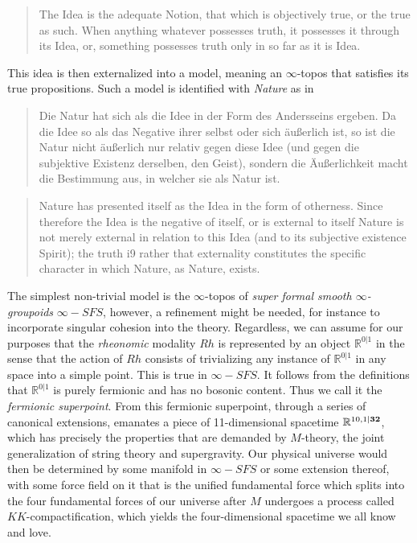 \documentclass{article}
\begin{document}
\begin{quote}
    The Idea is the adequate Notion, that which is objectively true, or the true as such. When anything whatever possesses truth, it possesses it through its Idea, or, something possesses truth only in so far as it is Idea.
\end{quote}

This idea is then externalized into a model, meaning an $\infty$-topos that satisfies its true propositions. Such a model is identified with \emph{Nature} as in 

\begin{quote}
    Die Natur hat sich als die Idee in der Form des Andersseins ergeben. Da die Idee so als das Negative ihrer selbst oder sich äußerlich ist, so ist die Natur nicht äußerlich nur relativ gegen diese Idee (und gegen die subjektive Existenz derselben, den Geist), sondern die Äußerlichkeit macht die Bestimmung aus, in welcher sie als Natur ist.
\end{quote}

\begin{quote}
    Nature has presented itself as the Idea in the form of otherness. Since therefore the Idea is the negative of itself, or is external to itself Nature is not merely external in relation to this Idea (and to its subjective existence Spirit); the truth i9 rather that externality constitutes the specific character in which Nature, as Nature, exists.
\end{quote}

The simplest non-trivial model is the $\infty$-topos of \emph{super formal smooth $\infty$-groupoids} $\infty-SFS$, however, a refinement might be needed, for instance to incorporate singular cohesion into the theory. Regardless, we can assume for our purposes that the \emph{rheonomic} modality $Rh$ is represented by an object $\mathbb{R}^{0|1}$ in the sense that the action of $Rh$ consists of trivializing any instance of  $\mathbb{R}^{0|1}$ in any space into a simple point. This is true in $\infty-SFS$. It follows from the definitions that $\mathbb{R}^{0|1}$ is purely fermionic and has no bosonic content. Thus we call it the \emph{fermionic superpoint}. From this fermionic superpoint, through a series of canonical extensions, emanates a piece of 11-dimensional spacetime $\mathbb{R}^{10,1|\textrm{\textbf{32}}}$, which has precisely the properties that are demanded by $M$-theory, the joint generalization of string theory and supergravity. Our physical universe would then be determined by some manifold in $\infty-SFS$ or some extension thereof, with some force field on it that is the unified fundamental force which splits into the four fundamental forces of our universe after $M$ undergoes a process called $KK$-compactification, which yields the four-dimensional spacetime we all know and love. \\
\end{document}
